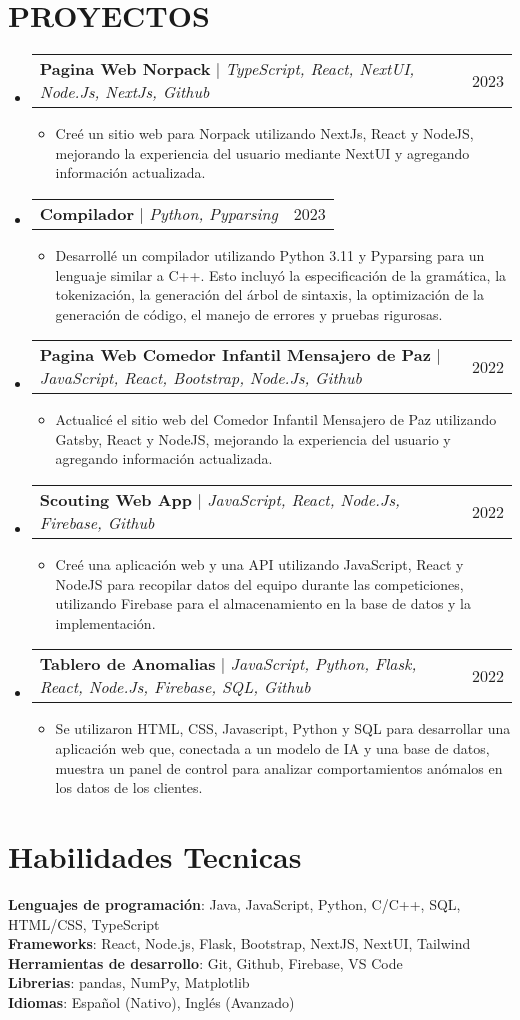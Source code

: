 \documentclass[letterpaper,11pt]{article}
\makeatletter
\newcommand{\resumeItem}[1]{
  \item\small{
    {#1 \vspace{-2pt}}
  }
}
\newcommand{\resumeProjectHeading}[2]{
    \item
    \begin{tabular*}{0.97\textwidth}{l@{\extracolsep{\fill}}r}
      \small#1 & #2 \\
    \end{tabular*}\vspace{-7pt}
}
\newcommand{\resumeSubHeadingListStart}{\begin{itemize}[leftmargin=0.15in, label={}]}
\newcommand{\resumeSubHeadingListEnd}{\end{itemize}}
\newcommand{\resumeItemListStart}{\begin{itemize}}
\newcommand{\resumeItemListEnd}{\end{itemize}\vspace{-5pt}}
\makeatother
\begin{document}
\section{PROYECTOS}
\resumeSubHeadingListStart
\resumeProjectHeading
{\textbf{Pagina Web Norpack} $|$ \emph{TypeScript, React, NextUI, Node.Js, NextJs, Github}}{2023}
\resumeItemListStart
\resumeItem{Creé un sitio web para Norpack utilizando NextJs, React y NodeJS, mejorando la experiencia del usuario mediante NextUI y agregando información actualizada.}
\resumeItemListEnd
\resumeProjectHeading
{\textbf{Compilador} $|$ \emph{Python, Pyparsing}}{2023}
\resumeItemListStart
\resumeItem{Desarrollé un compilador utilizando Python 3.11 y Pyparsing para un lenguaje similar a C++. Esto incluyó la especificación de la gramática, la tokenización, la generación del árbol de sintaxis, la optimización de la generación de código, el manejo de errores y pruebas rigurosas.}
\resumeItemListEnd
\resumeProjectHeading
{\textbf{Pagina Web Comedor Infantil Mensajero de Paz} $|$ \emph{JavaScript, React, Bootstrap, Node.Js, Github}}{2022}
\resumeItemListStart
\resumeItem{Actualicé el sitio web del Comedor Infantil Mensajero de Paz utilizando Gatsby, React y NodeJS, mejorando la experiencia del usuario y agregando información actualizada.}
\resumeItemListEnd
\resumeProjectHeading
{\textbf{Scouting Web App} $|$ \emph{JavaScript, React, Node.Js, Firebase, Github}}{2022}
\resumeItemListStart
\resumeItem{Creé una aplicación web y una API utilizando JavaScript, React y NodeJS para recopilar datos del equipo durante las competiciones, utilizando Firebase para el almacenamiento en la base de datos y la implementación.}
\resumeItemListEnd
\resumeProjectHeading
{\textbf{Tablero de Anomalias} $|$ \emph{JavaScript, Python, Flask, React, Node.Js, Firebase, SQL, Github}}{2022}
\resumeItemListStart
\resumeItem{Se utilizaron HTML, CSS, Javascript, Python y SQL para desarrollar una aplicación web que, conectada a un modelo de IA y una base de datos, muestra un panel de control para analizar comportamientos anómalos en los datos de los clientes.}
\resumeItemListEnd
\resumeSubHeadingListEnd



%
\section{Habilidades Tecnicas}
\begin{itemize}[leftmargin=0.15in, label={}]
	\small{\item{
		            \textbf{Lenguajes de programación}{: Java, JavaScript, Python, C/C++, SQL, HTML/CSS, TypeScript} \\
		            \textbf{Frameworks}{: React, Node.js, Flask, Bootstrap, NextJS, NextUI, Tailwind} \\
		            \textbf{Herramientas de desarrollo}{: Git, Github, Firebase, VS Code} \\
		            \textbf{Librerias}{: pandas, NumPy, Matplotlib} \\
		            \textbf{Idiomas}{: Español (Nativo), Inglés (Avanzado)} \\
		      }}
\end{itemize}


\end{document}
